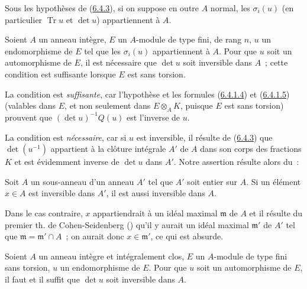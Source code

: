 
\begin{corollary}[6.4.4]
\label{II.6.4.4-fr}
Sous les hypothèses de (\hyperref[II.6.4.3-fr]{6.4.3}), si on suppose en outre
$A$ normal, les $\sigma_i(u)$ (en particulier $\operatorname{Tr}u$ et
$\det u$) appartiennent à $A$.
\end{corollary}

\begin{proposition}[6.4.5]
\label{II.6.4.5-fr}
Soient $A$ un anneau intègre, $E$ un $A$-module de type fini, de rang $n$, $u$
un endomorphisme de $E$ tel que les $\sigma_i(u)$ appartiennent à $A$. Pour
que $u$ soit un automorphisme de $E$, il est nécessaire que $\det u$ soit
inversible dans $A$~; cette condition est suffisante lorsque $E$ est sans
torsion.
\end{proposition}

La condition est \emph{suffisante}, car l'hypothèse et les formules
(\hyperref[II.6.4.1.4-fr]{6.4.1.4}) et
(\hyperref[II.6.4.1.5-fr]{6.4.1.5}) (valables dans $E$, et non seulement dans
$E\otimes_AK$, puisque $E$ est sans torsion) prouvent que
$(\det u)^{-1}Q(u)$ est l'inverse de $u$.

La condition est \emph{nécessaire}, car si $u$ est inversible, il résulte de
(\hyperref[II.6.4.3-fr]{6.4.3}) que $\det(u^{-1})$ appartient à la clôture
intégrale $A'$ de $A$ dans son corps des fractions $K$ et est évidemment
inverse de $\det u$ dans $A'$. Notre assertion résulte alors du~:

\begin{lemma}[6.4.5.1]
\label{II.6.4.5.1-fr}
Soit $A$ un sous-anneau d'un anneau $A'$ tel que $A'$ soit entier sur $A$. Si
un élément $x\in A$ est inversible dans $A'$, il est aussi inversible dans
$A$.
\end{lemma}

Dans le cas contraire, $x$ appartiendrait à un idéal maximal $\mathfrak{m}$
de $A$ et il résulte du premier th. de Cohen-Seidenberg
(\cite[t.~I, p.~257, th.~3]{I-13}) qu'il y aurait un idéal maximal
$\mathfrak{m}'$ de $A'$ tel que $\mathfrak{m}=\mathfrak{m}'\cap A$~; on aurait
donc $x\in\mathfrak{m}'$, ce qui est absurde.

\begin{corollary}[6.4.6]
\label{II.6.4.6-fr}
Soient $A$ un anneau intègre et intégralement clos, $E$ un $A$-module de type
fini sans torsion, $u$ un endomorphisme de $E$. Pour que $u$ soit un
automorphisme de $E$, il faut et il suffit que $\det u$ soit inversible dans
$A$.
\end{corollary}

